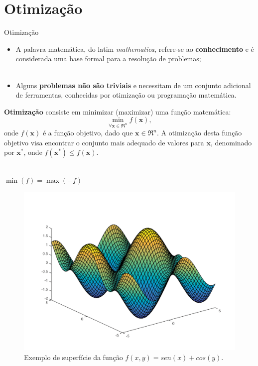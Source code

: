 \section{Otimização}
\label{s.optimization}

\begin{frame}{Otimização}
	\begin{itemize}
		\justifying
		\item A palavra matemática, do latim \emph{mathematica}, refere-se ao \textbf{conhecimento} e é considerada uma base formal para a resolução de problemas;
		\\~\\
		\item Alguns \textbf{problemas não são triviais} e necessitam de um conjunto adicional de ferramentas, conhecidas por otimização ou programação matemática.
		\end{itemize}
\end{frame}

\begin{frame}
	\textbf{Otimização} consiste em minimizar (maximizar) uma função matemática:
	\begin{equation}
		\label{e.min_opt}
		\min_{\forall \mathbf{x} \in {\Re^n}} f(\mathbf{x}),
	\end{equation}
	onde $f(\mathbf{x})$ é a função objetivo, dado que $\mathbf{x} \in \Re^n$. A otimização desta função objetivo visa encontrar o conjunto mais adequado de valores para $\mathbf{x}$, denominado por $\mathbf{x}^*$, onde $f(\mathbf{x}^*) \leq f(\mathbf{x})$.
	\\~\\
	\begin{block}{}
		\centering
			$\min(f) = \max(-f)$
	\end{block}	
\end{frame}

\begin{frame}
	\begin{figure}
		\centering
		\includegraphics[scale=0.45]{figs/opt_function.png}	
		\caption{Exemplo de superfície da função $f(x,y)=sen(x)+cos(y)$.}
		\label{f.opt_function}
	\end{figure}
\end{frame}

